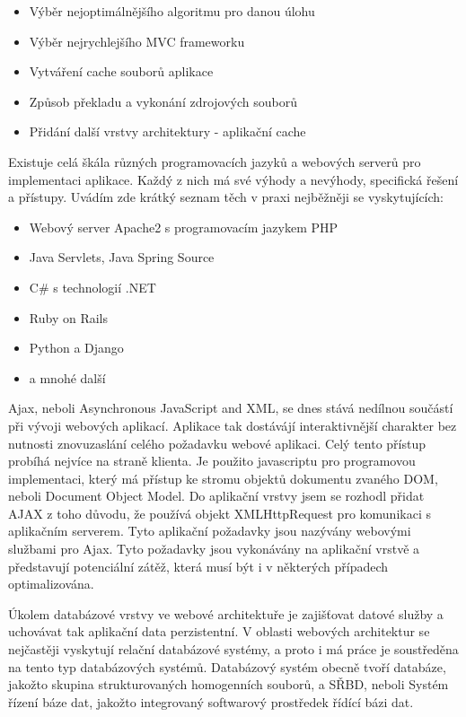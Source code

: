 \documentclass[12pt]{article}
\begin{document}
\begin{itemize}
\item Výběr nejoptimálnějšího algoritmu pro danou úlohu
\item Výběr nejrychlejšího MVC frameworku
\item Vytváření cache souborů aplikace
\item Způsob překladu a vykonání zdrojových souborů
\item Přidání další vrstvy architektury - aplikační cache
\end{itemize}

Existuje celá škála různých programovacích jazyků a webových serverů pro implementaci aplikace. Každý z nich má své výhody a nevýhody, specifická řešení a přístupy. Uvádím zde krátký seznam těch v praxi nejběžněji se vyskytujících:

\begin{itemize}
\item Webový server Apache2 s programovacím jazykem PHP
\item Java Servlets, Java Spring Source
\item C\# s technologií .NET
\item Ruby on Rails
\item Python a Django
\item a mnohé další
\end{itemize}

Ajax, neboli Asynchronous JavaScript and XML, se dnes stává nedílnou součástí při vývoji webových aplikací. Aplikace tak dostávájí interaktivnější charakter bez nutnosti znovuzaslání celého požadavku webové aplikaci. Celý tento přístup probíhá nejvíce na straně klienta. Je použito javascriptu pro programovou implementaci, který má přístup ke stromu objektů dokumentu zvaného DOM, neboli Document Object Model. Do aplikační vrstvy jsem se rozhodl přidat AJAX z toho důvodu, že používá objekt XMLHttpRequest pro komunikaci s aplikačním serverem. Tyto aplikační požadavky jsou nazývány webovými službami pro Ajax. Tyto požadavky jsou vykonávány na aplikační vrstvě a představují potenciální zátěž, která musí být i v některých případech optimalizována.\cite{ajax}



\label{sec:database}
Úkolem databázové vrstvy ve webové architektuře je zajišťovat datové služby a uchovávat tak aplikační data perzistentní. V oblasti webových architektur se nejčastěji vyskytují relační databázové systémy, a proto i má práce je soustředěna na tento typ databázových systémů. Databázový systém obecně tvoří databáze, jakožto skupina strukturovaných homogenních souborů, a SŘBD, neboli Systém řízení báze dat, jakožto integrovaný softwarový prostředek řídící bázi dat.
\end{document}
